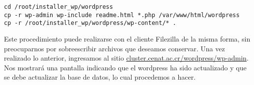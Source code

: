 \begin{lstlisting}
cd /root/installer_wp/wordpress
cp -r wp-admin wp-include readme.html *.php /var/www/html/wordpress
cp -r /root/installer_wp/wordpress/wp-content/* .
\end{lstlisting}

Este procedimiento puede realizarse con el cliente Filezilla de la misma forma, sin preocuparnos por sobreescribir archivos que deseamos conservar. Una vez realizado lo anterior, ingresamos al sitio \url{cluster.cenat.ac.cr/wordpress/wp-admin}. Nos mostrará una pantalla indicando que el wordpress ha sido actualizado y que se debe actualizar la base de datos, lo cual procedemos a hacer. 

\clearpage